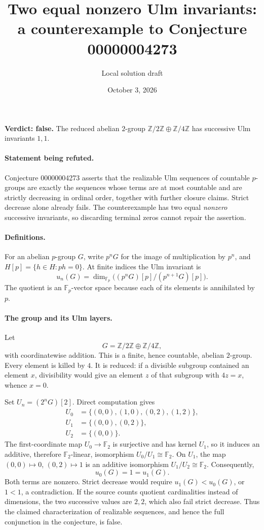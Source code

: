 \documentclass[10pt]{article}
\title{Two equal nonzero Ulm invariants: a counterexample to Conjecture 00000004273}
\author{Local solution draft}
\date{October 3, 2026}
\makeatletter
\renewcommand{\maketitle}{\begin{center}
{\Large\bfseries\@title\par}\vspace{0.6em}
{\small\@author\par\@date}
\end{center}\vspace{0.5em}}
\makeatother
\begin{document}
\maketitle
\noindent\textbf{Verdict: false.} The reduced abelian $2$-group $\mathbb Z/2\mathbb Z\oplus\mathbb Z/4\mathbb Z$ has successive Ulm invariants $1,1$.

\paragraph{Statement being refuted.}
Conjecture 00000004273 asserts that the realizable Ulm sequences of countable $p$-groups are exactly the sequences whose terms are at most countable and are strictly decreasing in ordinal order, together with further closure claims. Strict decrease alone already fails. The counterexample has two equal \emph{nonzero} successive invariants, so discarding terminal zeros cannot repair the assertion.

\paragraph{Definitions.}
For an abelian $p$-group $G$, write $p^nG$ for the image of multiplication by $p^n$, and $H[p]=\{h\in H:ph=0\}$. At finite indices the Ulm invariant is
\[
 u_n(G)=\dim_{\mathbb F_p}\big((p^nG)[p]/(p^{n+1}G)[p]\big).
\]
The quotient is an $\mathbb F_p$-vector space because each of its elements is annihilated by $p$.

\paragraph{The group and its Ulm layers.}
Let
\[
 G=\mathbb Z/2\mathbb Z\oplus\mathbb Z/4\mathbb Z,
\]
with coordinatewise addition. This is a finite, hence countable, abelian $2$-group. Every element is killed by $4$. It is reduced: if a divisible subgroup contained an element $x$, divisibility would give an element $z$ of that subgroup with $4z=x$, whence $x=0$.

Set $U_n=(2^nG)[2]$. Direct computation gives
\begin{align*}
 U_0&=\{(0,0),(1,0),(0,2),(1,2)\},\\
 U_1&=\{(0,0),(0,2)\},\\
 U_2&=\{(0,0)\}.
\end{align*}
The first-coordinate map $U_0\to\mathbb F_2$ is surjective and has kernel $U_1$, so it induces an additive, therefore $\mathbb F_2$-linear, isomorphism $U_0/U_1\cong\mathbb F_2$. On $U_1$, the map $(0,0)\mapsto0$, $(0,2)\mapsto1$ is an additive isomorphism $U_1/U_2\cong\mathbb F_2$. Consequently,
\[
 u_0(G)=1=u_1(G).
\]
Both terms are nonzero. Strict decrease would require $u_1(G)<u_0(G)$, or $1<1$, a contradiction. If the source counts quotient cardinalities instead of dimensions, the two successive values are $2,2$, which also fail strict decrease. Thus the claimed characterization of realizable sequences, and hence the full conjunction in the conjecture, is false.
\end{document}
